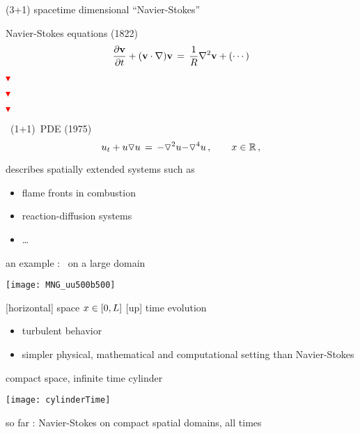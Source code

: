 \begin{frame}{(3+1) spacetime dimensional ``Navier-Stokes''}
\begin{block}{Navier-Stokes equations \hfill (1822)}
\[
\dfrac{\partial \bv}{\partial t} + (\bv \cdot \nabla) \bv
	\,=\,
\frac{1}{R} \nabla ^2 \bv + (\cdots)
\]
\end{block}
    \centerline{\textcolor{red}{$\blacktriangledown$}}
    \centerline{\textcolor{red}{$\blacktriangledown$}}
    \centerline{\textcolor{red}{$\blacktriangledown$}}
\begin{block}{\KS\ (1+1)\dmn\ PDE \hfill (1975)}
\[
  u_t + u \triangledown u \,=\,
    {\color{red}-}\triangledown^2 u {\color{red}-\triangledown^4 u}
    \,,\qquad   x \in \mathbb{R}
    \,,
\]
\end{block}
\bigskip

describes spatially extended systems such as
\begin{itemize}
 \item flame fronts in combustion
 \item reaction-diffusion systems
 \item \ldots
\end{itemize}
\end{frame}

\begin{frame}{an example : \KS\ on a large domain}
\begin{center}
  \texttt{[image: MNG\_uu500b500]}
\end{center}

{\footnotesize
[horizontal] space $\ssp \in [0,L]$
\qquad
{[up]} time evolution
}

\begin{itemize}
\item turbulent behavior
\item simpler physical, mathematical and computational setting than Navier-Stokes
\end{itemize}
\end{frame}

\begin{frame}{compact space, infinite time cylinder}
\begin{center}
\texttt{[image: cylinderTime]}
\end{center}
so far : Navier-Stokes on compact spatial domains, all times
\end{frame}

